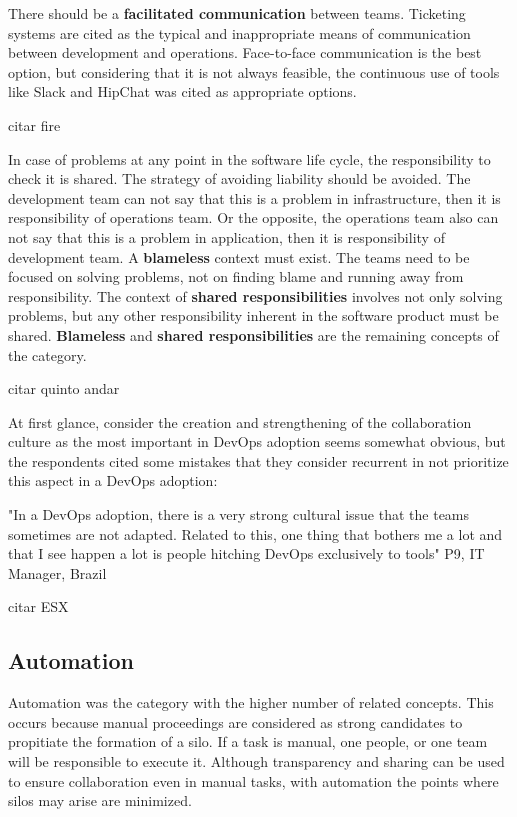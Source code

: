 There should be a \textbf{facilitated communication} between teams. Ticketing
systems are cited as the typical and inappropriate means of communication
between development and operations. Face-to-face communication is the best
option, but considering that it is not always feasible, the continuous use of
tools like Slack and HipChat was cited as appropriate options.

citar fire

In case of problems at any point in the software life cycle, the responsibility
to check it is shared. The strategy of avoiding liability should be avoided.
The development team can not say that this is a problem in infrastructure, then
it is responsibility of operations team. Or the opposite, the operations team
also can not say that this is a problem in application, then it is
responsibility of development team. A \textbf{blameless} context must exist.
The teams need to be focused on solving problems, not on finding blame and
running away from responsibility. The context of \textbf{shared
responsibilities} involves not only solving problems, but any other
responsibility inherent in the software product must be shared.
\textbf{Blameless} and \textbf{shared responsibilities} are the remaining
concepts of the category.

citar quinto andar

At first glance, consider the creation and strengthening of the collaboration
culture as the most important in DevOps adoption seems somewhat obvious, but
the respondents cited some mistakes that they consider recurrent in not
prioritize this aspect in a DevOps adoption:

"In a DevOps adoption, there is a very strong cultural issue that the teams
sometimes are not adapted. Related to this, one thing that bothers me a lot and
that I see happen a lot is people hitching DevOps exclusively to tools" P9, IT
Manager, Brazil

citar ESX

\subsection{Automation} \label{ssec:automation}
Automation was the category with the higher number of related concepts. This
occurs because manual proceedings are considered as strong candidates to
propitiate the formation of a silo. If a task is manual, one people, or one
team will be responsible to execute it. Although transparency and sharing can
be used to ensure collaboration even in manual tasks, with automation the
points where silos may arise are minimized.

